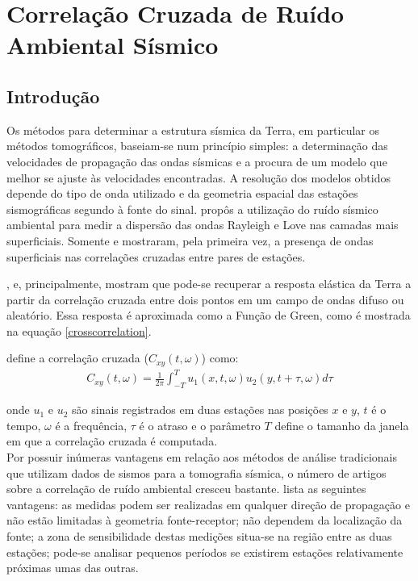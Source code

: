 \chapter{Correlação Cruzada de Ruído Ambiental Sísmico}

\section{Introdução}

Os métodos para determinar a estrutura sísmica da Terra, em particular os métodos tomográficos, baseiam-se num princípio simples: a determinação das velocidades de propagação das ondas sísmicas e a procura de um modelo que melhor se ajuste às velocidades encontradas. A resolução dos modelos obtidos depende do tipo de onda utilizado e da geometria espacial das estações sismográficas segundo à fonte do sinal. \cite{aki_space_1957} propôs a utilização do ruído sísmico ambiental para medir a dispersão das ondas Rayleigh e Love nas camadas mais superficiais. Somente \cite{campillo_long-range_2003}  e \cite{shapiro_emergence_2004} mostraram, pela primeira vez, a  presença de ondas superficiais nas correlações cruzadas entre pares de estações.

\cite{campillo_long-range_2003}, \cite{shapiro_emergence_2004} e, principalmente, \cite{wapenaar_retrieving_2004} mostram que pode-se recuperar a resposta elástica da Terra a partir da correlação cruzada entre dois pontos em  um campo de ondas difuso ou aleatório. Essa resposta é aproximada como a Função de Green, como é mostrada na equação \ref{crosscorrelation}. 

\cite{boschi_measuring_2013} define a correlação cruzada ($C_{xy}(t,\omega)$) como: 
\begin{eqnarray}
\label{crosscorrelation}
C_{xy}(t,\omega) = \frac{1}{2\pi}\int_{-T}^{T}u_{1}(x,t,\omega)u_{2}(y,t+\tau,\omega) d\tau
\end{eqnarray}

onde $u_{1}$ e $u_{2}$ são sinais registrados em duas estações nas posições $x$ e $y$, $t$ é o tempo, $\omega$ é a frequência, $\tau$ é o atraso e o parâmetro $T$ define o tamanho da janela em que a correlação cruzada é computada.
\\

Por possuir inúmeras vantagens em relação aos métodos de análise tradicionais que utilizam dados de sismos para a tomografia sísmica, o número de artigos sobre a correlação de ruído ambiental cresceu bastante. \cite{shapiro_emergence_2004} lista as seguintes vantagens: as medidas podem ser realizadas em qualquer direção de propagação e não estão limitadas à geometria fonte-receptor; não dependem da localização da fonte; a zona de sensibilidade destas medições situa-se na região entre as duas estações; pode-se analisar pequenos períodos se existirem estações relativamente próximas umas das outras.

